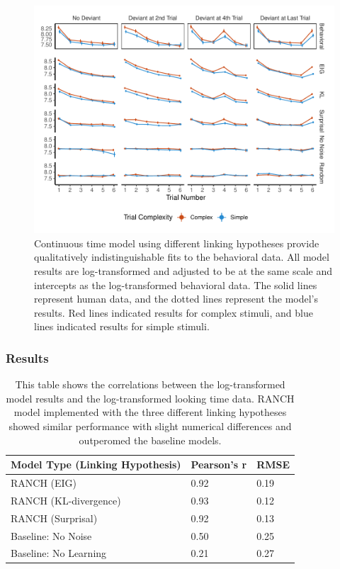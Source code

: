 \documentclass[10pt, letterpaper]{article}
\newenvironment{CodeChunk}{}{}
\begin{document}
\begin{CodeChunk}
\begin{figure}[t!]

{\centering \includegraphics{figs/experiment_res-1} 

}

\caption[Continuous time model using different linking hypotheses provide qualitatively indistinguishable fits to the behavioral data]{Continuous time model using different linking hypotheses provide qualitatively indistinguishable fits to the behavioral data. All model results are log-transformed and adjusted to be at the same scale and intercepts as the log-transformed behavioral data. The solid lines represent human data, and the dotted lines represent the model's results. Red lines indicated results for complex stimuli, and blue lines indicated results for simple stimuli.}\label{fig:experiment_res}
\end{figure}
\end{CodeChunk}

\hypertarget{results-1}{%
\subsubsection{Results}\label{results-1}}

\begin{table}[ht]
\centering
\begin{tabular}{lll}
  \hline
Model Type (Linking Hypothesis) & Pearson's r & RMSE \\ 
  \hline
RANCH (EIG) & 0.92 & 0.19 \\ 
  RANCH (KL-divergence) & 0.93 & 0.12 \\ 
  RANCH (Surprisal) & 0.92 & 0.13 \\ 
  Baseline: No Noise & 0.50 & 0.25 \\ 
  Baseline: No Learning & 0.21 & 0.27 \\ 
   \hline
\end{tabular}
\caption{This table shows the correlations between the log-transformed model results and the log-transformed looking time data. RANCH model implemented with the three different linking hypotheses showed similar performance with slight numerical differences and outperomed the baseline models.} 
\end{table}
\end{document}
